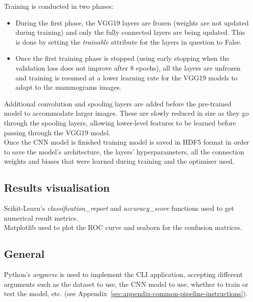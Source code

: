 Training is conducted in two phases:
\begin{itemize}
    \item During the first phase, the VGG19 layers are frozen (weights are not updated during training) and only the fully connected layers are being updated. This is done by setting the \textit{trainable} attribute for the layers in question to False.
    \item Once the first training phase is stopped (using early stopping when the validation loss does not improve after 8 epochs), all the layers are unfrozen and training is resumed at a lower learning rate for the VGG19 models to adapt to the mammograms images.
\end{itemize}

Additional convolution and spooling layers are added before the pre-trained model to accommodate larger images. These are slowly reduced in size as they go through the spooling layers, allowing lower-level features to be learned before passing through the VGG19 model.\\

Once the CNN model is finished training model is saved in HDF5 format in order to save the model's architecture, the layers' hyperparameters, all the connection weights and biases that were learned during training \citep{Geron2019} and the optimiser used.


\subsection{Results visualisation}

Scikit-Learn's \textit{classification\_report} and \textit{accuracy\_score} functions used to get numerical result metrics.\\

Matplotlib used to plot the ROC curve and seaborn for the confusion matrices.


\subsection{General}

Python's \textit{argparse} is used to implement the CLI application, accepting different arguments such as the dataset to use, the CNN model to use, whether to train or test the model, etc. (see Appendix~\ref{sec:appendix-common-pipeline-instructions}).

